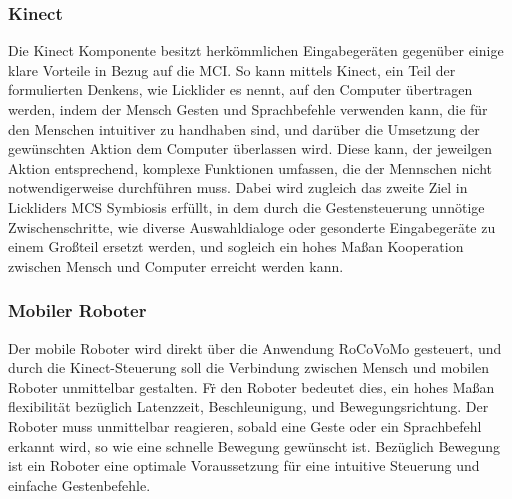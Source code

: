 \subsubsection{Kinect}
Die Kinect Komponente besitzt herk\"ommlichen Eingabeger\"aten gegen\"uber einige klare Vorteile in Bezug auf die \gls{MCI}. So kann mittels Kinect, ein Teil der formulierten Denkens, wie Licklider es nennt, auf den Computer \"ubertragen werden, indem der Mensch Gesten und Sprachbefehle verwenden kann, die f\"ur den Menschen intuitiver zu handhaben sind, und dar\"uber die Umsetzung der gew\"unschten Aktion dem Computer \"uberlassen wird. Diese kann, der jeweilgen Aktion entsprechend, komplexe Funktionen umfassen, die der Mennschen nicht notwendigerweise durchf\"uhren muss. Dabei wird zugleich das zweite Ziel in Lickliders \gls{MCS} Symbiosis erf\"ullt, in dem durch die Gestensteuerung unn\"otige Zwischenschritte, wie diverse Auswahldialoge oder gesonderte Eingabeger\"ate zu einem Gro\ss teil ersetzt werden, und sogleich ein hohes Ma\ss an Kooperation zwischen Mensch und Computer erreicht werden kann. 

\subsubsection{Mobiler Roboter}
Der mobile Roboter wird direkt \"uber die Anwendung RoCoVoMo gesteuert, und durch die Kinect-Steuerung soll die Verbindung zwischen Mensch und mobilen Roboter unmittelbar gestalten. F\"r den Roboter bedeutet dies, ein hohes Ma\ss an flexibilit\"at bez\"uglich Latenzzeit, Beschleunigung, und Bewegungsrichtung. Der Roboter muss unmittelbar reagieren, sobald eine Geste oder ein Sprachbefehl erkannt wird, so wie eine schnelle Bewegung gew\"unscht ist. Bez\"uglich Bewegung ist ein  Roboter eine optimale Voraussetzung f\"ur eine intuitive Steuerung und einfache Gestenbefehle.

